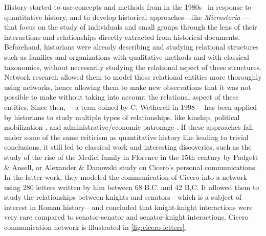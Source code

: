History started to use concepts and methods from \sna in the 1980s~\cite{wetherellHistoricalSocialNetwork1998} in response to quantitative history,
and to develop historical approaches---like \textit{Microstoria} \cite{ginzburgMicrohistoire1981}---that focus on the study of individuals and small groups through the lens of their interactions and relationships directly extracted from historical documents.
Beforehand, historians were already describing and studying relational structures such as families and organizations with qualitative methods and with classical taxonomies, without necessarily studying the relational aspect of these structures.
Network research allowed them to model those relational entities more thoroughly using networks, hence allowing them to make new observations that it was not possible to make without taking into account the relational aspect of these entities\cite{cristofoliAuxSourcesGrands2008}.
Since then, \hsna---a term coined by C. Wetherell in 1998 \cite{wetherellHistoricalSocialNetwork1998}---has been applied by historians to study multiple types of relationships, like kinship\cite{hambergerScanningPatternsRelationship2014},  political mobilization \cite{lippKinshipNetworksLocal2005}, and administrative/economic patronage \cite{moutoukias1992}.
If these approaches fall under some of the same criticism as quantitative history \cite{lemercier12FormalNetwork2015} like leading to trivial conclusions, it still led to classical work and interesting discoveries, such as the study of the rise of the Medici family in Florence in the 15th century by Padgett \& Ansell\cite{padgettRobustActionRise1993}, or Alexander \& Danowski study on Cicero's personal communications\cite{alexanderAnalysisAncientNetwork1990}.
In the latter work, they modeled the communication of Cicero into a network using 280 letters written by him between 68 B.C. and 42 B.C.
It allowed them to study the relationships between knights and senators---which is a subject of interest in Roman history---and concluded that knight-knight interactions were very rare compared to senator-senator and senator-knight interactions.
Cicero communication network is illustrated in \autoref{fig:cicero-letters}.


